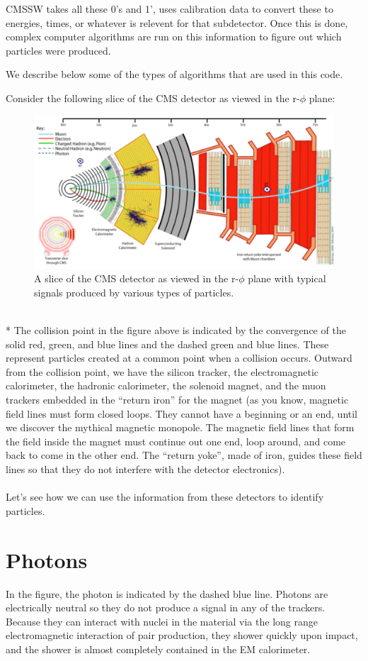 CMSSW takes all these 0's and 1', uses calibration data to convert these to energies, times, or whatever is relevent for that subdetector.  Once this is done,   complex computer algorithms are run on this information to figure out which particles were produced.  

We describe below some of the types of algorithms that are used in this code.


Consider the following slice of the CMS detector as viewed in the r-$\phi$ plane: 
\begin{figure}[h]
\centering\includegraphics[scale=0.6]{./particleID/Pictures/fig1.pdf}
\caption{A slice of the CMS detector as viewed in the r-$\phi$ plane with typical signals produced by various types of particles. }
\label{fig:pdgdedx}
\end{figure} 
\\*
The collision point in the figure above is indicated by the convergence of the solid red, green, and blue lines and the dashed green and blue lines.  These represent particles created at a common point when a collision occurs.  Outward from the collision point, we have the silicon tracker, the electromagnetic calorimeter, the hadronic calorimeter, the solenoid magnet, and the muon trackers embedded in the ``return iron'' for the magnet (as you know, magnetic field lines must form closed loops. They cannot have a beginning or an end, until we discover the mythical magnetic monopole. The magnetic field lines that form the field inside the magnet must continue out one end, loop around, and come back to come in the other end. The ``return yoke'', made of iron, guides these field lines so that they do not interfere with the detector electronics).  
\\
\\
\noindent
Let's see how we can use the information from these detectors to identify particles.
\section{Photons}
In the figure, the photon is indicated by the dashed blue line.  Photons are electrically neutral so they do not produce a signal in any of the trackers.  Because they can interact with nuclei in the material via the long range electromagnetic interaction of pair production, they shower quickly upon impact, and the shower is almost completely contained in the EM calorimeter.
